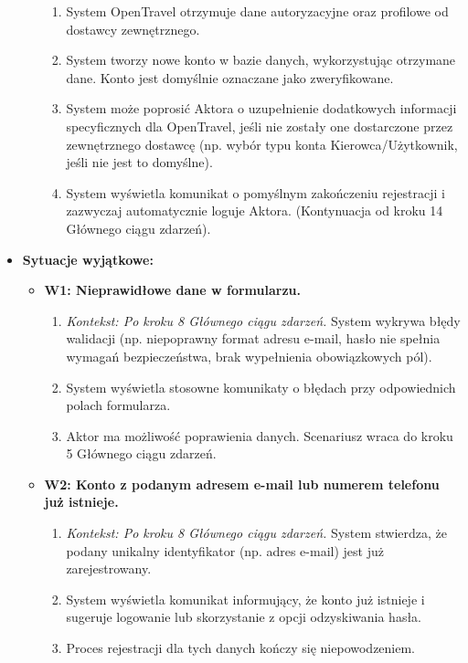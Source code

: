 \documentclass[a4paper,12pt]{article}
\begin{document}
\begin{itemize}
\begin{itemize}
\begin{enumerate}
                    \item System OpenTravel otrzymuje dane autoryzacyjne oraz profilowe od dostawcy zewnętrznego.
                    \item System tworzy nowe konto w bazie danych, wykorzystując otrzymane dane. Konto jest domyślnie oznaczane jako zweryfikowane.
                    \item System może poprosić Aktora o uzupełnienie dodatkowych informacji specyficznych dla OpenTravel, jeśli nie zostały one dostarczone przez zewnętrznego dostawcę (np. wybór typu konta Kierowca/Użytkownik, jeśli nie jest to domyślne).
                    \item System wyświetla komunikat o pomyślnym zakończeniu rejestracji i zazwyczaj automatycznie loguje Aktora. (Kontynuacja od kroku 14 Głównego ciągu zdarzeń).
                \end{enumerate}
        \end{itemize}
    \item \textbf{Sytuacje wyjątkowe:}
        \begin{itemize}
            \item \textbf{W1: Nieprawidłowe dane w formularzu.}
                \begin{enumerate}
                    \item \textit{Kontekst: Po kroku 8 Głównego ciągu zdarzeń.} System wykrywa błędy walidacji (np. niepoprawny format adresu e-mail, hasło nie spełnia wymagań bezpieczeństwa, brak wypełnienia obowiązkowych pól).
                    \item System wyświetla stosowne komunikaty o błędach przy odpowiednich polach formularza.
                    \item Aktor ma możliwość poprawienia danych. Scenariusz wraca do kroku 5 Głównego ciągu zdarzeń.
                \end{enumerate}
            \item \textbf{W2: Konto z podanym adresem e-mail lub numerem telefonu już istnieje.}
                \begin{enumerate}
                    \item \textit{Kontekst: Po kroku 8 Głównego ciągu zdarzeń.} System stwierdza, że podany unikalny identyfikator (np. adres e-mail) jest już zarejestrowany.
                    \item System wyświetla komunikat informujący, że konto już istnieje i sugeruje logowanie lub skorzystanie z opcji odzyskiwania hasła.
                    \item Proces rejestracji dla tych danych kończy się niepowodzeniem.

\end{enumerate}
\end{itemize}
\end{itemize}
\end{document}
